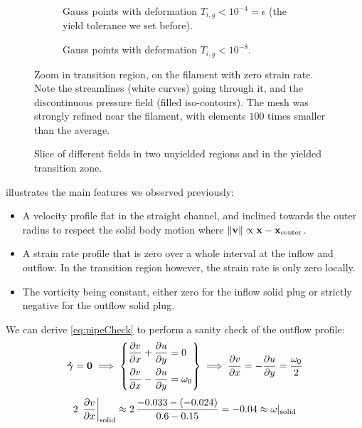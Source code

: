 \documentclass[11 pt]{report}
\begin{document}
\begin{figure}[!b]
    \centering
    \begin{subfigure}[t]{\textwidth}
        
        \caption{Gauss points with deformation $T_{i,g} < 10^{-4} = \epsilon$ (the yield tolerance we set before).}
        \label{fig:pipeFilament1}
    \end{subfigure}\vspace{10pt}
    \begin{subfigure}[t]{\textwidth}
        
        \caption{Gauss points with deformation $T_{i,g} < 10^{-8}$.}
        \label{fig:pipeFilament2}
    \end{subfigure}
    \caption{Zoom in transition region, on the filament with zero strain rate. Note the streamlines (white curves) going through it, and the discontinuous pressure field (filled iso-contours). The mesh was strongly refined near the filament, with elements $100$ times smaller than the average.}
    \label{fig:pipeFilament}
\end{figure}

\begin{figure}[t]
    \centering
    
    \caption{Slice of different fields in two unyielded regions and in the yielded transition zone.}
    \label{fig:pipeProfiles}
\end{figure}

 illustrates the main features we observed previously:
\begin{itemize}
    \item A velocity profile flat in the straight channel, and inclined towards the outer radius to respect the solid body motion where $\|\mathbf{v}\| \propto \mathbf{x}-\mathbf{x}_{\text{center}}$.
    \item A strain rate profile that is zero over a whole interval at the inflow and outflow. In the transition region however, the strain rate is only zero locally.
    \item The vorticity being constant, either zero for the inflow solid plug or strictly negative for the outflow solid plug.
\end{itemize}

We can derive \cref{eq:pipeCheck} to perform a sanity check of the outflow profile:
\begin{equation}
    \boldsymbol{\dot \gamma}=\mathbf{0} \implies 
    \left\{\begin{aligned}
        &\pdv{v}{x} + \pdv{u}{y} = 0\\
        &\pdv{v}{x} - \pdv{u}{y} = \omega_0\\
    \end{aligned}\right\}
    \implies \pdv{v}{x} = -\pdv{u}{y} = \frac{\omega_0}{2}
    \label{eq:pipeCheck}
\end{equation}
\begin{equation}
    2\,\left.\pdv{v}{x}\right\vert_{\text{solid}} \approx 2\,\frac{-0.033 - (-0.024)}{0.6-0.15} = -0.04 \approx \omega\vert_{\text{solid}}
\end{equation}
\end{document}
